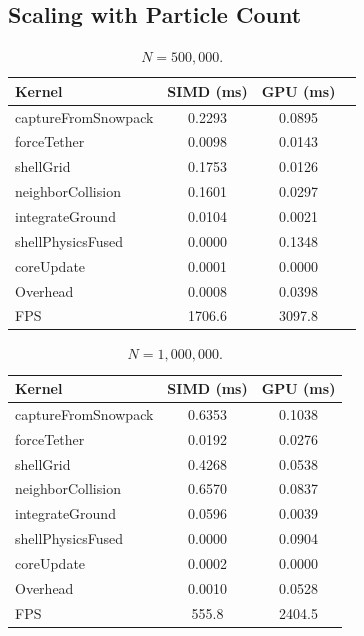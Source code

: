 \subsection{Scaling with Particle Count}

\begin{table}[H]
  \caption{$N = 500{,}000$.}
  \label{tab:GTX_scaling_500k}
  \centering
  \scriptsize
  \begin{tabular}{@{}lccc@{}}
    \toprule
    \textbf{Kernel} & \textbf{SIMD (ms)} & \textbf{GPU (ms)} \\
    \midrule
    captureFromSnowpack        & 0.2293 & 0.0895 \\
    forceTether                & 0.0098 & 0.0143 \\
    shellGrid                  & 0.1753 & 0.0126 \\
    neighborCollision          & 0.1601 & 0.0297 \\
    integrateGround            & 0.0104 & 0.0021 \\
    shellPhysicsFused          & 0.0000 & 0.1348 \\
    coreUpdate                 & 0.0001 & 0.0000 \\
    Overhead                   & 0.0008 & 0.0398 \\
    \bottomrule
    FPS                        & 1706.6 & 3097.8 \\
  \end{tabular}
\end{table}

\begin{table}[H]
  \caption{$N = 1{,}000{,}000$.}
  \label{tab:GTX_scaling_1m}
  \centering
  \scriptsize
  \begin{tabular}{@{}lcc@{}}
    \toprule
    \textbf{Kernel} & \textbf{SIMD (ms)} & \textbf{GPU (ms)} \\
    \midrule
    captureFromSnowpack        & 0.6353 & 0.1038 \\
    forceTether                & 0.0192 & 0.0276 \\
    shellGrid                  & 0.4268 & 0.0538 \\
    neighborCollision          & 0.6570 & 0.0837 \\
    integrateGround            & 0.0596 & 0.0039 \\
    shellPhysicsFused          & 0.0000 & 0.0904 \\
    coreUpdate                 & 0.0002 & 0.0000 \\
    Overhead                   & 0.0010 & 0.0528 \\
    \bottomrule
    FPS                        & 555.8 & 2404.5 \\
  \end{tabular}
\end{table}

